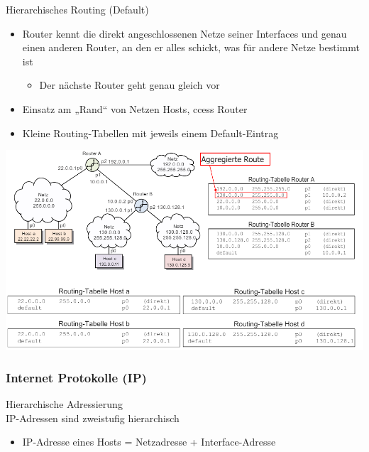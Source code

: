 \begin{concept}{Hierarchisches Routing (Default)}
    \begin{itemize}
        \item Router kennt die direkt angeschlossenen Netze seiner Interfaces und genau einen anderen Router, an den er alles schickt, was für andere Netze bestimmt ist
        \begin{itemize}
            \item Der nächste Router geht genau gleich vor
        \end{itemize}
        \item Einsatz am „Rand“ von Netzen Hosts, ccess Router
        \item Kleine Routing-Tabellen mit jeweils einem Default-Eintrag
    \end{itemize}
        \includegraphics[width=1\linewidth]{images/hierarchisches_routing.png}
\end{concept}

\columnbreak 

\subsubsection{Internet Protokolle (IP)}

\begin{definition}{Hierarchische Adressierung}\\
IP-Adressen sind zweistufig hierarchisch
\begin{itemize}
    \item IP-Adresse eines Hosts = Netzadresse + Interface-Adresse
\end{itemize}
\end{definition}

